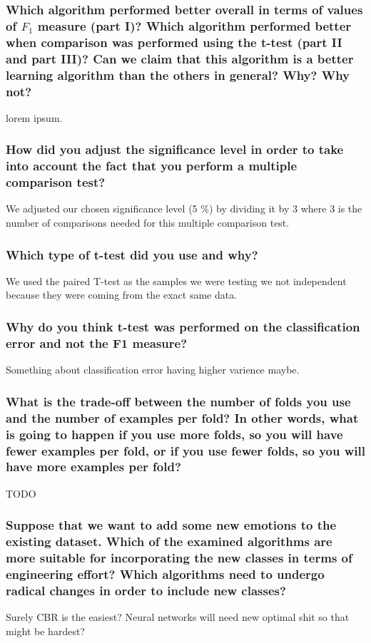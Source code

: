 \documentclass[12pt]{article}
\begin{document}
\subsubsection*{Which algorithm performed better overall in terms of values of $F_1$ measure (part I)? Which algorithm performed better when comparison was performed using the t-test (part II and part III)? Can we claim that this algorithm is a better learning algorithm than the others in general? Why? Why not?}

lorem ipsum.

\subsubsection*{How did you adjust the significance level in order to take into account the fact that you perform a multiple comparison test?}

We adjusted our chosen significance level (5 \%) by dividing it by 3 where 3 is the number of comparisons needed for this multiple comparison test.

\subsubsection*{Which type of t-test did you use and why?}

We used the paired T-test as the samples we were testing we not independent because they were coming from the exact same data.

\subsubsection*{Why do you think t-test was performed on the classification error and not the F1 measure?}

Something about classification error having higher varience maybe.

\subsubsection*{What is the trade-off between the number of folds you use and the number of examples per fold? In other words, what is going to happen if you use more folds, so you will have fewer examples per fold, or if you use fewer folds, so you will have more examples per fold?}

TODO

\subsubsection*{Suppose that we want to add some new emotions to the existing dataset. Which of the examined algorithms are more suitable for incorporating the new classes in terms of engineering effort? Which algorithms need to undergo radical changes in order to include new classes?}

Surely CBR is the easiest? Neural networks will need new optimal shit so that might be hardest?
\end{document}
